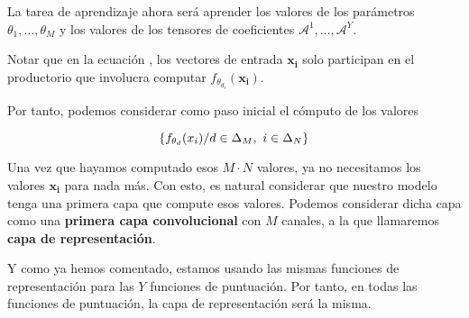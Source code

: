 La tarea de aprendizaje ahora será aprender los valores de los parámetros $\theta_1, \ldots, \theta_M$ y los valores de los tensores de coeficientes $\mathcal{A}^1, \ldots, \mathcal{A}^Y$.

\begin{observacion}
    Notar que en la ecuación , los vectores de entrada $\mathbf{x_i}$ solo participan en el productorio que involucra computar $f_{\theta_{d_i}}(\mathbf{x_i})$.

    Por tanto, podemos considerar como paso inicial el cómputo de los valores

    $$\{f_{\theta_d}(x_i) / d \in \Delta_{M},\ i \in \Delta_{N} \}$$

    Una vez que hayamos computado esos $M \cdot N$ valores, ya no necesitamos los valores $\mathbf{x_i}$ para nada más. Con esto, es natural considerar que nuestro modelo tenga una primera capa que compute esos valores. Podemos considerar dicha capa como una \textbf{primera capa convolucional} con $M$ canales, a la que llamaremos \textbf{capa de representación}.

    Y como ya hemos comentado, estamos usando las mismas funciones de representación para las $Y$ funciones de puntuación. Por tanto, en todas las funciones de puntuación, la capa de representación será la misma.
\end{observacion}



\endinput
